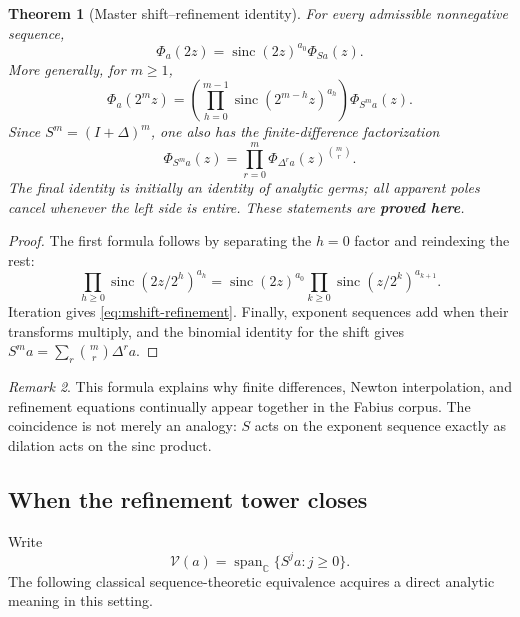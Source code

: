 \documentclass[11pt,oneside]{article}
\numberwithin{equation}{section}
\newtheorem{theorem}{Theorem}[section]
\theoremstyle{definition}
\theoremstyle{remark}
\newtheorem{remark}[theorem]{Remark}
\newcommand{\C}{\mathbb C}
\newcommand{\sinc}{\operatorname{sinc}}
\newcommand{\statusproved}{\textcolor{deepgreen}{\textbf{proved here}}}
\begin{document}
\begin{theorem}[Master shift--refinement identity]
\label{thm:shift-refinement}
For every admissible nonnegative sequence,
\begin{equation}
 \boxed{
 \Phi_a(2z)=\sinc(2z)^{a_0}\Phi_{Sa}(z).}
 \label{eq:shift-refinement}
\end{equation}
More generally, for $m\ge1$,
\begin{equation}
 \Phi_a(2^mz)
 =\left(\prod_{h=0}^{m-1}\sinc(2^{m-h}z)^{a_h}\right)
  \Phi_{S^ma}(z).
 \label{eq:mshift-refinement}
\end{equation}
Since $S^m=(I+\Delta)^m$, one also has the finite-difference factorization
\begin{equation}
 \boxed{
 \Phi_{S^ma}(z)
 =\prod_{r=0}^{m}\Phi_{\Delta^ra}(z)^{\binom mr}.}
 \label{eq:finite-difference-factorization}
\end{equation}
The final identity is initially an identity of analytic germs; all apparent poles cancel
whenever the left side is entire.  These statements are \statusproved.
\end{theorem}

\begin{proof}
The first formula follows by separating the $h=0$ factor and reindexing the rest:
\[
 \prod_{h\ge0}\sinc(2z/2^h)^{a_h}
 =\sinc(2z)^{a_0}
  \prod_{k\ge0}\sinc(z/2^k)^{a_{k+1}}.
\]
Iteration gives \eqref{eq:mshift-refinement}.  Finally, exponent sequences add when their
transforms multiply, and the binomial identity for the shift gives
$S^ma=\sum_r\binom mr\Delta^ra$.
\end{proof}

\begin{remark}
This formula explains why finite differences, Newton interpolation, and refinement equations
continually appear together in the Fabius corpus.  The coincidence is not merely an analogy:
$S$ acts on the exponent sequence exactly as dilation acts on the sinc product.
\end{remark}

\subsection{When the refinement tower closes}

Write
\[
 \mathscr V(a)=\operatorname{span}_{\C}\{S^ja:j\ge0\}.
\]
The following classical sequence-theoretic equivalence acquires a direct analytic meaning in
this setting.
\end{document}
